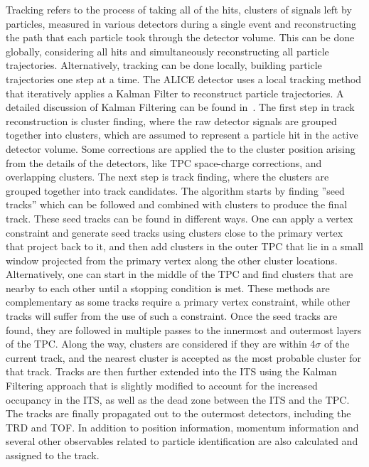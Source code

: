 Tracking refers to the process of taking all of the hits, clusters of signals left by particles, measured in various detectors during a single event and reconstructing the path that each particle took through the detector volume. This can be done globally, considering all hits and simultaneously reconstructing all particle trajectories. Alternatively, tracking can be done locally, building particle trajectories one step at a time. The ALICE detector uses a local tracking method that iteratively applies a Kalman Filter to reconstruct particle trajectories. A detailed discussion of Kalman Filtering can be found in~\cite{Kalman}.
The first step in track reconstruction is cluster finding, where the raw detector signals are grouped together into clusters, which are assumed to represent a particle hit in the active detector volume. Some corrections are applied the to the cluster position arising from the details of the detectors, like TPC space-charge corrections, and overlapping clusters. The next step is track finding, where the clusters are grouped together into track candidates. The algorithm starts by finding ”seed tracks” which can be followed and combined with clusters to produce the final track. These seed tracks can be found in different ways. One can apply a vertex constraint and generate seed tracks using clusters close to the primary vertex that project back to it, and then add clusters in the outer TPC that lie in a small window projected from the primary vertex along the other cluster locations. Alternatively, one can start in the middle of the TPC and find clusters that are nearby to each other until a stopping condition is met. These methods are complementary as some tracks require a primary vertex constraint, while other tracks will suffer from the use of such a constraint. Once the seed tracks are found, they are followed in multiple passes to the innermost and outermost layers of the TPC. Along the way, clusters are considered if they are within 4$\sigma$ of the current track, and the nearest cluster is accepted as the most probable cluster for that track. Tracks are then further extended into the ITS using the Kalman Filtering approach that is slightly modified to account for the increased occupancy in the ITS, as well as the dead zone between the ITS and the TPC. The tracks are finally propagated out to the outermost detectors, including the TRD and TOF. In addition to position information, momentum information and several other observables related to particle identification are also calculated and assigned to the track.